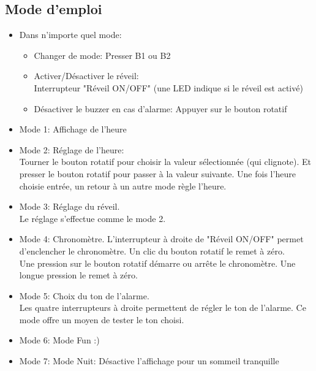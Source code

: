 \documentclass[a4paper, 11pt]{article}
\begin{document}
\subsection{Mode d'emploi}
\begin{minipage}{0.6\textwidth}
\begin{itemize}
\item Dans n'importe quel mode:
\begin{itemize}
\item Changer de mode: Presser B1 ou B2
\item Activer/Désactiver le réveil: \\Interrupteur "Réveil ON/OFF" (une LED indique si le réveil est activé)
\item Désactiver le buzzer en cas d'alarme: Appuyer sur le bouton rotatif
\end{itemize}
\item Mode 1: Affichage de l'heure
\item Mode 2: Réglage de l'heure:\\
Tourner le bouton rotatif pour choisir la valeur sélectionnée (qui clignote). Et presser le bouton rotatif pour passer à la valeur suivante. Une fois l'heure choisie entrée, un retour à un autre mode règle l'heure.
\item Mode 3: Réglage du réveil.\\Le réglage s'effectue comme le mode 2.
\item Mode 4: Chronomètre. L'interrupteur à droite de "Réveil ON/OFF" permet d'enclencher le chronomètre. Un clic du bouton rotatif le remet à zéro.\\
Une pression sur le bouton rotatif démarre ou arrête le chronomètre. Une longue pression le remet à zéro.
\item Mode 5: Choix du ton de l'alarme.\\ Les quatre interrupteurs à droite permettent de régler le ton de l'alarme. Ce mode offre un moyen de tester le ton choisi.
\item Mode 6: Mode Fun :)
\item Mode 7: Mode Nuit: Désactive l'affichage pour un sommeil tranquille
\end{itemize}
\end{minipage}
\end{document}
